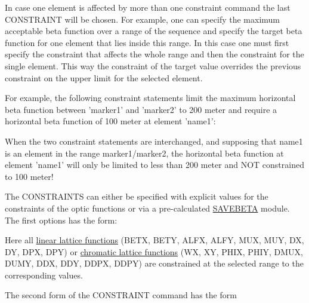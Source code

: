 In case one element is affected by more than one constraint command the
last CONSTRAINT will be chosen. For example, one can specify the
maximum acceptable beta function over a range of the sequence and
specify the target beta function for one element that lies inside this
range. In this case one must first specify the constraint that affects
the whole range and then the constraint for the single element. This way
the constraint of the target value overrides the previous constraint on
the upper limit for the selected element. 

For example, the following
constraint statements limit the maximum horizontal beta function between
'marker1' and 'marker2' to 200 meter and require a horizontal beta
function of 100 meter at element 'name1':  

When the two constraint statements are interchanged, and supposing that
name1 is an element in the range marker1/marker2, the horizontal beta 
function at element 'name1' will only be limited to less than 200 meter
and NOT constrained to 100 meter! 

The CONSTRAINTS can either be specified with explicit values for the
constraints of the optic functions or via a pre-calculated
\href{../control/general.html#savebeta}{SAVEBETA} module. The first
options has the form: 

Here all \href{../Introduction/tables.html#linear}{linear lattice functions} 
(BETX, BETY, ALFX, ALFY, MUX, MUY, DX, DY, DPX, DPY)
or \href{../Introduction/tables.html#chrom}{chromatic lattice functions}
(WX, XY, PHIX, PHIY, DMUX, DUMY, DDX, DDY, DDPX, DDPY)
are constrained at the selected range to the corresponding values.

The second form of the CONSTRAINT command has the form

